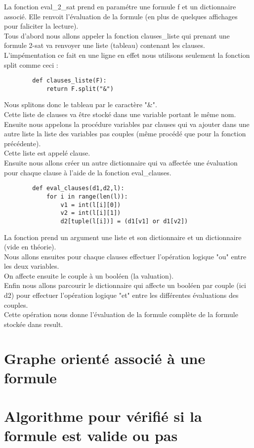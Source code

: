 \documentclass{article}
\begin{document}
    La fonction eval\_2\_sat prend en paramétre une formule f et un dictionnaire associé. Elle renvoit l'évaluation de la formule (en plus de quelques affichages pour faliciter la lecture). \\
    Tous d'abord nous allons appeler la fonction clauses\_liste qui prenant une formule 2-sat va renvoyer une liste (tableau) contenant les clauses. \\
    L'impémentation ce fait en une ligne en effet nous utilisons seulement la fonction split comme ceci : 
    \begin{lstlisting}
        def clauses_liste(F):
            return F.split("&")
    \end{lstlisting}
    Nous splitons donc le tableau par le caractère "\&". \\
    Cette liste de clauses va être stocké dans une variable portant le même nom. \\ 
    Ensuite nous appelons la procédure variables par clauses qui va ajouter dans une autre liste la liste des variables pas couples (même procédé que pour la fonction précédente). \\
    Cette liste est appelé clause. \\
    \newpage Ensuite nous allons créer un autre dictionnaire qui va affectée une évaluation pour chaque clause à l'aide de la fonction eval\_clauses. \\
    \begin{lstlisting}
        def eval_clauses(d1,d2,l):
            for i in range(len(l)):
                v1 = int(l[i][0])
                v2 = int(l[i][1])
                d2[tuple(l[i])] = (d1[v1] or d1[v2])
    \end{lstlisting}
    La fonction prend un argument une liste et son dictionnaire et un dictionnaire (vide en théorie). \\
    Nous allons ensuites pour chaque clauses effectuer l'opération logique "ou" entre les deux variables. \\
    On affecte ensuite le couple à un booléen (la valuation). \\
    Enfin nous allons parcourir le dictionnaire qui affecte un booléen par couple (ici d2) pour effectuer l'opération logique "et" entre les différentes évaluations des couples. \\
    Cette opération nous donne l'évaluation de la formule complète de la formule stockée dans result.   
    \section{Graphe orienté associé à une formule}
    \section{Algorithme pour vérifié si la formule est valide ou pas}
    
\end{document}
